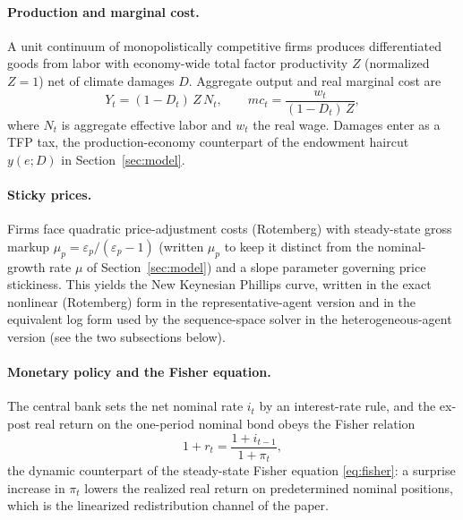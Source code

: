 \documentclass[12pt]{article}
\begin{document}
\paragraph{Production and marginal cost.} A unit continuum of
monopolistically competitive firms produces differentiated goods from labor
with economy-wide total factor productivity $Z$ (normalized $Z=1$) net of
climate damages $D$. Aggregate output and real marginal cost are
\begin{equation}
Y_t = (1-D_t)\,Z\,N_t, \qquad
mc_t = \frac{w_t}{(1-D_t)\,Z},
\label{eq:nk-production}
\end{equation}
where $N_t$ is aggregate effective labor and $w_t$ the real wage. Damages
enter as a TFP tax, the production-economy counterpart of the endowment
haircut $y(e;D)$ in Section~\ref{sec:model}.

\paragraph{Sticky prices.} Firms face quadratic price-adjustment costs
(Rotemberg) with steady-state gross markup
$\mu_p=\varepsilon_p/(\varepsilon_p-1)$ (written $\mu_p$ to keep it
distinct from the nominal-growth rate $\mu$ of Section~\ref{sec:model})
and a slope parameter governing price stickiness. This yields the New
Keynesian Phillips curve, written in the exact nonlinear (Rotemberg) form
in the representative-agent version and in the equivalent log form used by
the sequence-space solver in the heterogeneous-agent version (see the two
subsections below).

\paragraph{Monetary policy and the Fisher equation.} The central bank sets
the net nominal rate $i_t$ by an interest-rate rule, and the ex-post real
return on the one-period nominal bond obeys the Fisher relation
\begin{equation}
1 + r_t = \frac{1+i_{t-1}}{1+\pi_t},
\label{eq:nk-fisher}
\end{equation}
the dynamic counterpart of the steady-state Fisher equation
\eqref{eq:fisher}: a surprise increase in $\pi_t$ lowers the realized real
return on predetermined nominal positions, which is the linearized
redistribution channel of the paper.
\end{document}

